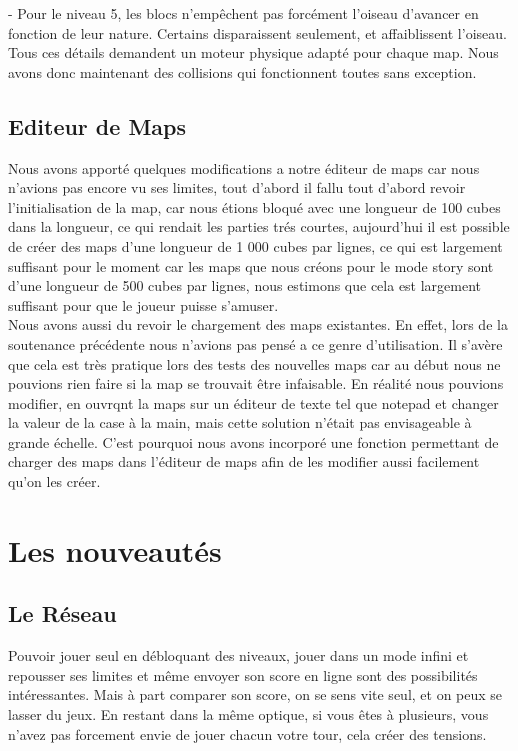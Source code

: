 \documentclass [11pt]{report}
\begin{document}
		\indent\indent - Pour le niveau 5, les blocs n'empêchent pas forcément l'oiseau d'avancer en fonction de leur nature. Certains disparaissent seulement, et affaiblissent l'oiseau.\\
		
		
		Tous ces détails demandent un moteur physique adapté pour chaque map. Nous avons donc maintenant des collisions qui fonctionnent toutes sans exception.
		
		\vspace{10mm}
		
	\section{Editeur de Maps}
		Nous avons apporté quelques modifications a notre éditeur de maps car nous n'avions pas encore vu ses limites, tout d'abord il fallu tout d'abord revoir l'initialisation de la map, car nous étions bloqué avec une longueur de 100 cubes dans la longueur, ce qui rendait les parties trés courtes, aujourd'hui il est possible de créer des maps d'une longueur de 1 000 cubes par lignes, ce qui est largement suffisant pour le moment car les maps que nous créons pour le mode story sont d'une longueur de 500 cubes par lignes, nous estimons que cela est largement suffisant pour que le joueur puisse s'amuser.\\
				
		\indent Nous avons aussi du revoir le chargement des maps existantes. En effet, lors de la soutenance précédente nous n'avions pas pensé a ce genre d'utilisation. Il s'avère que cela est très pratique lors des tests des nouvelles maps car au début nous ne pouvions rien faire si la map se trouvait \^etre infaisable. En réalité nous pouvions modifier, en ouvrqnt la maps sur un éditeur de texte tel que notepad et changer la valeur de la case \`a la main, mais cette solution n'était pas envisageable \`a grande échelle. C'est pourquoi nous avons incorporé une fonction permettant de charger des maps dans l'éditeur de maps afin de les modifier aussi facilement qu'on les créer.
		
		\vspace{10mm}
		
		
\chapter{Les nouveautés}
	\section{Le Réseau}
		Pouvoir jouer seul en débloquant des niveaux, jouer dans un mode infini et repousser ses limites et même envoyer son score en ligne sont des possibilités intéressantes. Mais à part comparer son score, on se sens vite seul, et on peux se lasser du jeux. En restant dans la même optique, si vous êtes à plusieurs, vous n'avez pas forcement envie de jouer chacun votre tour, cela créer des tensions.\\
		
\end{document}
